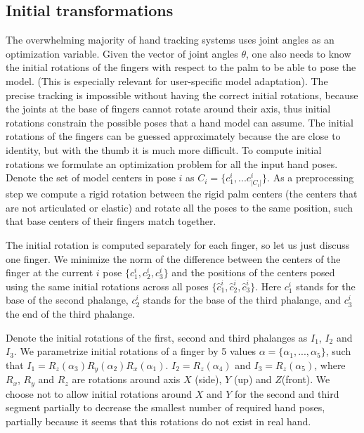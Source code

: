 \subsection{Initial transformations}
\begin{DRAFT}
The overwhelming majority of hand  tracking systems uses joint angles as an optimization variable. Given the vector of joint angles $\theta$, one also needs to know the initial rotations of the fingers with respect to the palm to be able to pose the model. (This is especially relevant for user-specific model adaptation). The precise tracking is impossible without having the correct initial rotations, because the joints at the base of fingers cannot rotate around their axis, thus initial rotations constrain the possible poses that a hand model can assume. The initial rotations of the fingers can be guessed approximately because the are close to identity, but with the thumb it is much more difficult.  
To compute initial rotations we formulate an optimization problem for all the input hand poses. Denote the set of model centers in pose $i$ as $C_i = \{c_1^i, ... c_{|C_i| }^i\}$. As a preprocessing step we compute a rigid rotation between the rigid palm centers (the centers that are not articulated or elastic) and rotate all the poses to the same position, such that base centers of their fingers match together.

The initial rotation is computed separately for each finger, so let us just discuss one finger. We minimize the norm of the difference between the centers of the finger at the current $i$ pose $\{c_1^i, c_2^i, c_3^i \}$ and the positions of the centers posed using the same initial rotations across all poses $\{\hat{c}_1^i, \hat{c}_2^i, \hat{c}_3^i \}$. Here $c_1^i$ stands for the base of the second phalange, $c_2^i$ stands for the base of the third phalange, and $c_3^i$ the end of the third phalange.

Denote the initial rotations of the first, second and third phalanges as $I_1$, $I_2$ and $I_3$. We parametrize initial rotations of a finger by 5 values $\alpha = \{\alpha_1, ..., \alpha_5\}$, such that $I_1 = R_z(\alpha_3) R_y(\alpha_2) R_x(\alpha_1).$  $I_2 = R_z(\alpha_4)$ and $I_3 = R_z(\alpha_5)$, where $R_x$, $R_y$ and $R_z$ are rotations around axis $X$ (side), $Y$ (up) and $Z$(front). We choose not to allow initial rotations around $X$ and $Y$ for the second and third segment partially to decrease the smallest number of required hand poses, partially because it seems that this rotations do not exist in real hand.


\end{DRAFT}
